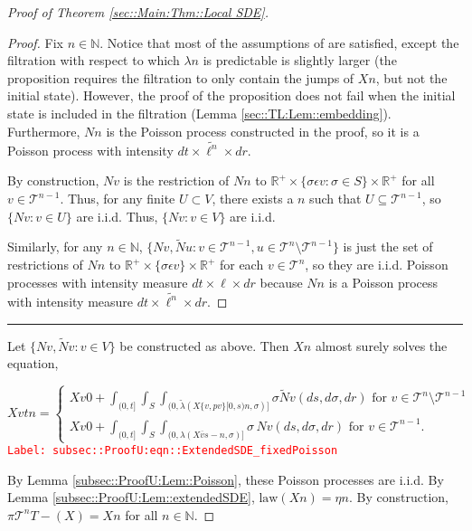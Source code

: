 \documentclass[12pt]{article}
\newcommand{\mb}{\mathbb}
\newcommand{\mc}{\mathcal}
\newcommand{\ov}{\overline}
\newcommand{\te}{\text}
\newcommand{\ep}{\epsilon}
\newcommand{\tr}{\textcolor{red}}
\newcommand{\labe}[1]{\tr{\texttt{Label: #1}}}
\newcommand{\ind}{\hspace{24pt}}
\newcommand{\lin}{\rule{\linewidth}{0.4 pt}}
\renewcommand{\v}{v}							%
\newcommand{\vv}{u}								%
\renewcommand{\U}{U}							%
\renewcommand{\S}{S}							%
\newcommand{\s}{\sigma}							%
\newcommand{\ev}{\ep}							%
\newcommand{\T}{T}								%
\renewcommand{\t}{t}							%
\newcommand{\proj}{\pi}							%
\renewcommand{\tt}{s}							%
\newcommand{\X}{X}								%
\newcommand{\cl}{\ov}							%
\newcommand{\tree}{\mc{T}}						%
\newcommand{\sln}[1]{^{#1}}						%
\newcommand{\poiss}{N}							%
\newcommand{\Sm}{\ell}							%
\newcommand{\rate}{\lambda}						%
\renewcommand{\r}{r}							%
\newcommand{\alt}[1]{\widetilde{#1}}			%
\newcommand{\mmm}{\eta}							%
\newcommand{\crate}{\alt{\lambda}}				%
\newcommand{\p}{p}								%
\begin{document}
\begin{proof}[Proof of Theorem \ref{sec::Main:Thm::Local SDE}]
\begin{proof}
Fix \(n \in \mb{N}\). Notice that most of the assumptions of \cite[Proposition 14.7.I(b)]{DalVer08} are satisfied, except the filtration with respect to which \(\rate{n}\) is predictable is slightly larger (the proposition requires the filtration to only contain the jumps of \(\X{}{}{n}\), but not the initial state). However, the proof of the proposition does not fail when the initial state is included in the filtration (Lemma \ref{sec::TL:Lem::embedding}). Furthermore, \(\poiss{n}\) is the Poisson process constructed in the proof, so it is a Poisson process with intensity \(d\t\times \alt{\Sm^n}\times d\r\).

\ind By construction, \(\poiss{\v}\) is the restriction of \(\poiss{n}\) to \(\mb{R}^+ \times \{\s\ev{\v}: \s\in \S\}\times \mb{R}^+\) for all \(\v\in \tree\sln{n-1}\). Thus, for any finite \(\U \subset  V\), there exists a \(n\) such that \(\U \subseteq \tree\sln{n-1}\), so \(\{\poiss{\v}: \v\in \U\}\) are i.i.d. Thus, \(\{\poiss{\v}: \v\in  V\}\) are i.i.d.

\ind Similarly, for any \(n \in \mb{N}\), \(\{\poiss{\v},\alt{\poiss}{\vv}: \v \in \tree\sln{n-1},\vv\in\tree\sln{n}\setminus\tree\sln{n-1}\}\) is just the set of restrictions of \(\poiss{n}\) to \(\mb{R}^+\times\{\s\ev{\v}\}\times\mb{R}^+\) for each \(\v\in \tree\sln{n}\), so they are i.i.d. Poisson processes with intensity measure \(d\t\times \Sm\times d\r\) because \(\poiss{n}\) is a Poisson process with intensity measure \(d\t\times\alt{\Sm^n}\times d\r\).
\end{proof}

\lin

Let \(\{\poiss{\v},\alt{\poiss}{\v}:\v\in V\}\) be constructed as above. Then \(\X{}{}{n}\) almost surely solves the equation,

\begin{equation}
\X{\v}{\t}{n} = \begin{cases}
\X{\v}{0}{} + \int_{(0,\t]}\int_\S\int_{(0,\crate{}{}(\X{\{\v,\p{\v}\}}{[0,\tt)}{n},\s)]}\s\alt{\poiss}{\v}(d\tt,d\s,d\r)\te{ for } \v \in \tree\sln{n}\setminus\tree\sln{n-1}\\
\X{\v}{0}{} + \int_{(0,\t]}\int_\S\int_{(0,\rate{}(\X{\cl{\v}}{\tt-}{n},\s)]}\s\,\poiss{\v}(d\tt,d\s,d\r)\te{ for } \v \in \tree\sln{n-1}.
\end{cases}
\label{subsec::ProofU:eqn::ExtendedSDE_fixedPoisson}
\end{equation}
\labe{subsec::ProofU:eqn::ExtendedSDE\_fixedPoisson}

By Lemma \ref{subsec::ProofU:Lem::Poisson}, these Poisson processes are i.i.d. By Lemma \ref{subsec::ProofU:Lem::extendedSDE}, \(\te{law}(\X{}{}{n}) = \mmm{}{}{n}\). By construction, \(\proj{\tree\sln{n}}{\T-}(\X{}{}) = \X{}{}{n}\) for all \(n\in\mb{N}\).


\end{proof}
\end{document}
